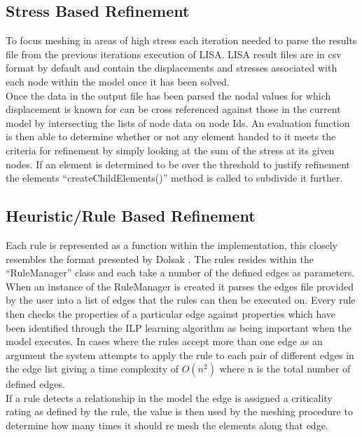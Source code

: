 \subsection{Stress Based Refinement}
To focus meshing in areas of high stress each iteration needed to parse the results file from the previous iterations execution of LISA. LISA result files are in csv format by default and contain the displacements and stresses associated with each node within the model once it has been solved. \\

\noindent
Once the data in the output file has been parsed the nodal values for which displacement is known for can be cross referenced against those in the current model by intersecting the lists of node data on node Ids. An evaluation function is then able to determine whether or not any element handed to it meets the criteria for refinement by simply looking at the sum of the stress at its given nodes. If an element is determined to be over the threshold to justify refinement the elements ``createChildElements()'' method is called to subdivide it further. \\


\subsection{Heuristic/Rule Based Refinement}
Each rule is represented as a function within the implementation, this closely resembles the format presented by Dolsak \cite{DolsakPaper91, DolsakPaper94, appOfILPToFEMeshDesign} \cite{ConsultRuleIntelltSystemFE}. The rules resides within the ``RuleManager'' class and each take a number of the defined edges as parameters. When an instance of the RuleManager is created it parses the edges file provided by the user into a list of edges that the rules can then be executed on. Every rule then checks the properties of a particular edge against properties which have been identified through the ILP learning algorithm as being important when the model executes. In cases where the rules accept more than one edge as an argument the system attempts to apply the rule to each pair of different edges in the edge list giving a time complexity of $O(n^2)$ where n is the total number of defined edges.\\

\noindent
If a rule detects a relationship in the model the edge is assigned a criticality rating as defined by the rule, the value is then used by the meshing procedure to determine how many times it should re mesh the elements along that edge. \\ 
 

